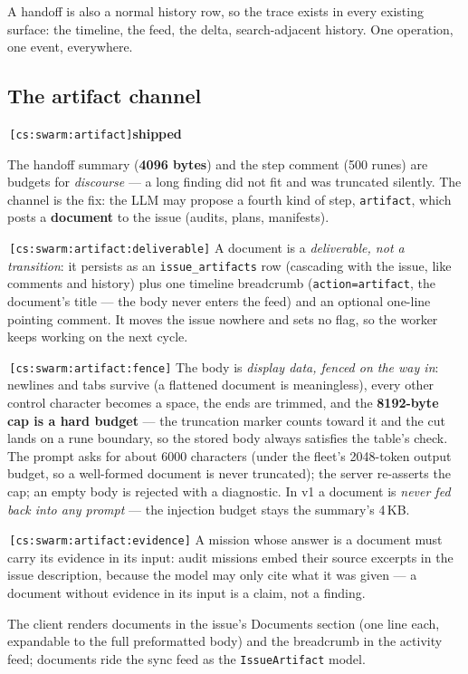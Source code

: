\documentclass[11pt,a4paper]{report}
\newcommand{\cs}[1]{\,\texttt{\scriptsize[cs:#1]}\label{cs:#1}}
\newcommand{\shipped}{\textbf{\textcolor{green!45!black}{shipped}}}
\begin{document}
A handoff is also a normal history row, so the trace exists in every
existing surface: the timeline, the feed, the delta, search-adjacent
history. One operation, one event, everywhere.

\subsection{The artifact channel}
\cs{swarm:artifact}\shipped\

The handoff summary (\textbf{4096 bytes}) and the step comment (500
runes) are budgets for \emph{discourse} --- a long finding did not fit
and was truncated silently. The channel is the fix: the LLM may propose
a fourth kind of step, \texttt{artifact}, which posts a \textbf{document}
to the issue (audits, plans, manifests).

\cs{swarm:artifact:deliverable} A document is a \emph{deliverable, not a
transition}: it persists as an \texttt{issue\_artifacts} row (cascading
with the issue, like comments and history) plus one timeline breadcrumb
(\texttt{action=artifact}, the document's title --- the body never
enters the feed) and an optional one-line pointing comment. It moves the
issue nowhere and sets no flag, so the worker keeps working on the next
cycle.

\cs{swarm:artifact:fence} The body is \emph{display data, fenced on the
way in}: newlines and tabs survive (a flattened document is
meaningless), every other control character becomes a space, the ends
are trimmed, and the \textbf{8192-byte cap is a hard budget} --- the
truncation marker counts toward it and the cut lands on a rune boundary,
so the stored body always satisfies the table's check. The prompt asks
for about 6000 characters (under the fleet's 2048-token output budget,
so a well-formed document is never truncated); the server re-asserts
the cap; an empty body is rejected with a diagnostic. In v1 a document
is \emph{never fed back into any prompt} --- the injection budget stays
the summary's 4\,KB.

\cs{swarm:artifact:evidence} A mission whose answer is a document must
carry its evidence in its input: audit missions embed their source
excerpts in the issue description, because the model may only cite what
it was given --- a document without evidence in its input is a claim,
not a finding.

The client renders documents in the issue's Documents section (one line
each, expandable to the full preformatted body) and the breadcrumb in
the activity feed; documents ride the sync feed as the
\texttt{IssueArtifact} model.
\end{document}

